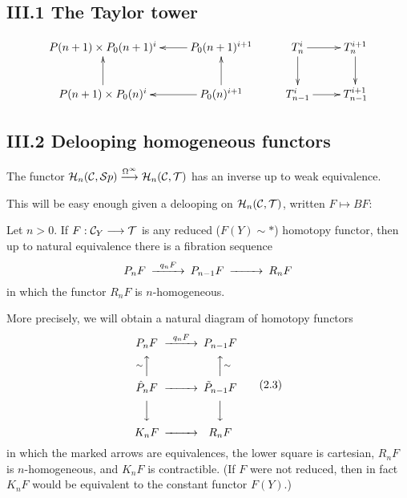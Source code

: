 \documentclass[11pt]{article}
\begin{document}
\subsection*{III.1 The Taylor tower}
\[\xymatrix{
P(n+1)\times P_0(n+1)^i
&%
P_0(n+1)^{i+1}
\ar[l]
&%
T_n^i
\ar[r]
\ar[d]_{}="1"
&%
T_n^{i+1}
\ar[d]
\\%
P(n+1)\times P_0(n)^i
\ar[u]
&%
P_0(n)^{i+1}
\ar[l]
\ar[u]_{}="2"
&%
T^i_{n-1}
\ar[r]
&%
T^{i+1}_{n-1}
}\]
\subsection*{III.2 Delooping homogeneous functors}
\begin{thm*}[\textbf{2.1}]
The functor
$
\mathcal{H}_n(\mathcal{C},\mathcal{S} p)\overset{\Omega^\infty}{\longrightarrow}\mathcal{H}_n(\mathcal{C},\mathcal{T})
$
has an inverse up to weak equivalence.
\end{thm*}
This will be easy enough given a delooping on $\mathcal{H}_n(\mathcal{C},\mathcal{T})$, written $F\mapsto BF$:
\begin{lem*}[\textbf{2.2}]
Let $n>0$. If $F:\mathcal{C}_Y\longrightarrow\mathcal{T}$ is
any reduced ($F(Y)\sim *$) homotopy functor, then up to natural equivalence
there is a fibration sequence
$$\CD
                            P_nF @>{q_nF}>> P_{n-1}F @>>> R_nF
\endCD
$$
in which the functor $R_nF$ is $n$-homogeneous.
\end{lem*}




More precisely, we will obtain a
natural  diagram of homotopy functors
\[
\CD
P_nF @>{q_nF}>> P_{n-1}F\\
@A{\sim}AA @AA{\sim}A\\
\hat P_nF @>>> \tilde P_{n-1}F\\
@VVV @VVV\\
K_nF @>>> R_nF
\endCD\tag{2.3}
\]
in which the marked arrows are equivalences, the lower square
is cartesian,
$R_nF$ is
$n$-homogeneous, and $K_nF$ is contractible. (If $F$ were not reduced,
then in fact $K_nF$ would be equivalent to the constant functor
$F(Y)$.)
\end{document}
